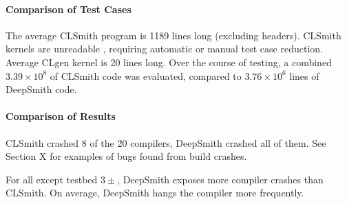 \paragraph{Comparison of Test Cases}
The average CLSmith program is 1189 lines long (excluding headers). CLSmith kernels are unreadable , requiring automatic or manual test case reduction.
Average CLgen kernel is 20 lines long.
Over the course of testing, a combined $3.39 \times 10^8$ of CLSmith code was evaluated, compared to $3.76 \times 10^6$ lines of DeepSmith code.


\paragraph{Comparison of Results}

CLSmith crashed 8 of the 20 compilers, DeepSmith crashed all of them. See Section X for examples of bugs found from build crashes.

For all except testbed $3\pm$, DeepSmith exposes more compiler crashes than CLSmith. On average, DeepSmith hangs the compiler more frequently. \cc{\ldots}

